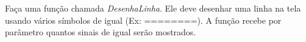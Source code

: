 
\question[10]

Faça uma função chamada \emph{DesenhaLinha}. Ele deve desenhar uma linha na tela usando vários símbolos de igual (Ex: ========). A função recebe por parâmetro quantos sinais de igual serão mostrados.